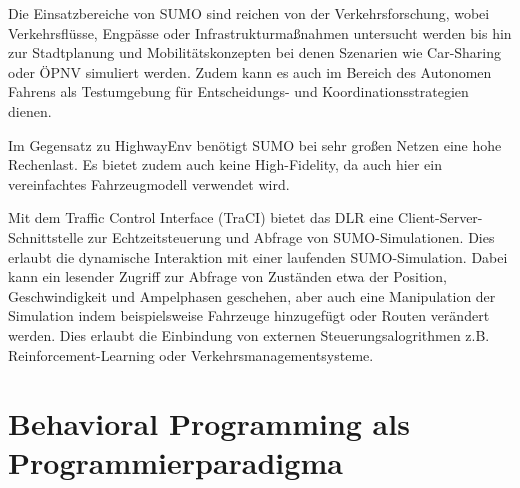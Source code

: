 Die Einsatzbereiche von SUMO sind reichen von der Verkehrsforschung, wobei Verkehrsflüsse, Engpässe oder Infrastrukturmaßnahmen untersucht werden bis hin zur Stadtplanung und Mobilitätskonzepten bei denen Szenarien wie Car-Sharing oder ÖPNV simuliert werden. Zudem kann es auch im Bereich des Autonomen Fahrens als Testumgebung für Entscheidungs- und Koordinationsstrategien dienen.

Im Gegensatz zu HighwayEnv benötigt SUMO bei sehr großen Netzen eine hohe Rechenlast. Es bietet zudem auch keine High-Fidelity, da auch hier ein vereinfachtes Fahrzeugmodell verwendet wird.

Mit dem Traffic Control Interface (TraCI) bietet das DLR eine Client-Server-Schnittstelle zur Echtzeitsteuerung und Abfrage von SUMO-Simulationen. Dies erlaubt die dynamische Interaktion mit einer laufenden SUMO-Simulation. Dabei kann ein lesender Zugriff zur Abfrage von Zuständen etwa der Position, Geschwindigkeit und Ampelphasen geschehen, aber auch eine Manipulation der Simulation indem beispielsweise Fahrzeuge hinzugefügt oder Routen verändert werden. Dies erlaubt die Einbindung von externen Steuerungsalogrithmen z.B. Reinforcement-Learning oder Verkehrsmanagementsysteme.

\section{Behavioral Programming als Programmierparadigma}